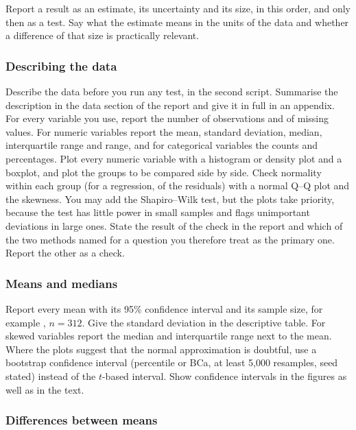 \documentclass[11pt,a4paper]{article}
\begin{document}
Report a result as an estimate, its uncertainty and its size, in this order, and only then as a test. Say what the estimate means in the units of the data and whether a difference of that size is practically relevant.

\subsubsection*{Describing the data}

Describe the data before you run any test, in the second script. Summarise the description in the data section of the report and give it in full in an appendix. For every variable you use, report the number of observations and of missing values. For numeric variables report the mean, standard deviation, median, interquartile range and range, and for categorical variables the counts and percentages. Plot every numeric variable with a histogram or density plot and a boxplot, and plot the groups to be compared side by side. Check normality within each group (for a regression, of the residuals) with a normal Q--Q plot and the skewness. You may add the Shapiro--Wilk test, but the plots take priority, because the test has little power in small samples and flags unimportant deviations in large ones. State the result of the check in the report and which of the two methods named for a question you therefore treat as the primary one. Report the other as a check.

\subsubsection*{Means and medians}

Report every mean with its 95\% confidence interval and its sample size, for example , $n=312$. Give the standard deviation in the descriptive table. For skewed variables report the median and interquartile range next to the mean. Where the plots suggest that the normal approximation is doubtful, use a bootstrap confidence interval (percentile or BCa, at least 5{,}000 resamples, seed stated) instead of the $t$-based interval. Show confidence intervals in the figures as well as in the text.

\subsubsection*{Differences between means}
\end{document}
